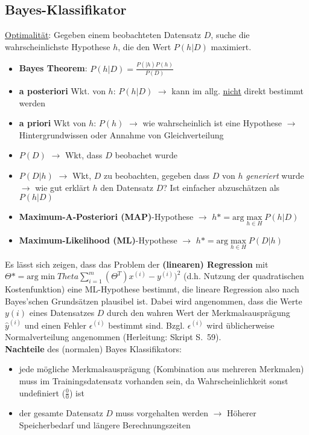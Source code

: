 \subsection{Bayes-Klassifikator}
\label{bayes}

\underline{Optimalität}: Gegeben einem beobachteten Datensatz $D$, suche die wahrscheinlichste Hypothese $h$, die den Wert $P(h\vert D)$ maximiert.\\

\begin{itemize}
    \item \textbf{Bayes Theorem}: $P(h\vert D)=\frac{P(\vert h)P(h)}{P(D)}$
    \item \textbf{a posteriori} Wkt. von $h$: $P(h\vert D)$ $\rightarrow$ kann im allg. \underline{nicht} direkt bestimmt werden
    \item \textbf{a priori} Wkt von $h$: $P(h)$ $\rightarrow$ wie wahrscheinlich ist eine Hypothese $\rightarrow$ Hintergrundwissen oder Annahme von Gleichverteilung
    \item $P(D)$ $\rightarrow$ Wkt, dass $D$ beobachet wurde
    \item $P(D\vert h)$ $\rightarrow$ Wkt, $D$ zu beobachten, gegeben dass $D$ von $h$ \emph{generiert} wurde $\rightarrow$ wie gut erklärt $h$ den Datensatz $D$? Ist einfacher abzuschätzen als $P(h\vert D)$
    \item \textbf{Maximum-A-Posteriori (MAP)}-Hypothese $\rightarrow$ $h* = \text{arg} \underset{h\in H}{\max}P(h\vert D)$
    \item \textbf{Maximum-Likelihood (ML)}-Hypothese $\rightarrow$ $h* = \text{arg} \underset{h\in H}{\max}P(D\vert h)$ \\
\end{itemize}

Es lässt sich zeigen, dass das Problem der \textbf{(linearen) Regression} mit $\Theta* = \text{arg} \min{Theta}\sum_{i=1}^m (\Theta^T)x^{(i)}-y^{(i)})^2$ (d.h. Nutzung der quadratischen Kostenfunktion) eine ML-Hypothese bestimmt, die lineare Regression also nach Bayes'schen Grundsätzen plausibel ist. Dabei wird angenommen, dass die Werte $y{(i)}$ eines Datensatzes $D$ durch den wahren Wert der Merkmalsausprägung $\hat{y}^{(i)}$ und einen Fehler $\epsilon^{(i)}$ bestimmt sind. Bzgl. $\epsilon^{(i)}$ wird üblicherweise Normalverteilung angenommen (Herleitung: Skript S.~59).\\

\textbf{Nachteile} des (normalen) Bayes Klassifikators:
\begin{itemize}
    \item jede mögliche Merkmalsausprägung (Kombination aus mehreren Merkmalen) muss im Trainingsdatensatz vorhanden sein, da Wahrscheinlichkeit sonst undefiniert ($\frac{0}{0}$) ist
    \item der gesamte Datensatz $D$ muss vorgehalten werden $\rightarrow$ Höherer Speicherbedarf und längere Berechnungszeiten
\end{itemize}

